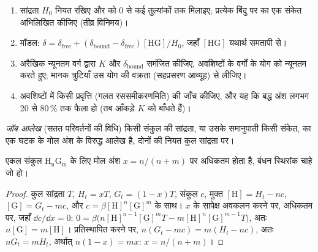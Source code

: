 \begin{method}[NMR अनुमापन से बंधन स्थिरांक]\label{met:b3:supramolecular:nmr-titration}
\begin{enumerate}
  \item {} सांद्रता $H_0$ नियत रखिए और  को 0 से कई
        तुल्यांकों तक मिलाइए; प्रत्येक बिंदु पर  का एक संकेत अभिलिखित कीजिए (तीव्र विनिमय)।
  \item मॉडल: $\delta = \delta_{\mathrm{free}} + (\delta_{\mathrm{bound}} - \delta_{\mathrm{free}})[\mathrm{HG}]/H_0$, जहाँ $[\mathrm{HG}]$ यथार्थ समतापी से।
  \item अरैखिक न्यूनतम वर्ग द्वारा $K$ और $\delta_{\mathrm{bound}}$ समंजित कीजिए, अवशिष्टों के वर्गों के योग को
        न्यूनतम करते हुए; मानक त्रुटियाँ उस योग की वक्रता
        (सहप्रसरण आव्यूह) से लीजिए।
  \item अवशिष्टों में किसी प्रवृत्ति (गलत रससमीकरणमिति) की जाँच कीजिए, और यह कि
        बद्ध अंश लगभग 20 से 80\,\% तक फैला हो (तब आँकड़े $K$ को बाँधते हैं)।
\end{enumerate}
\end{method}

\begin{definition}[जॉब आलेख]\label{def:b3:supramolecular:job}
\emph{जॉब आलेख} (सतत परिवर्तनों की विधि) किसी संकुल की सांद्रता,
या उसके समानुपाती किसी संकेत, का एक घटक के मोल अंश के विरुद्ध
आलेख है, दोनों की नियत कुल
सांद्रता पर।
\end{definition}

\begin{proposition}[जॉब आलेख का अधिकतम]\label{prop:b3:supramolecular:job}
एकल संकुल $\mathrm{H_nG_m}$ के लिए   मोल अंश
$x = n/(n + m)$ पर अधिकतम होता है, बंधन स्थिरांक चाहे जो हो।
\end{proposition}

\begin{proof}
कुल सांद्रता $T$, $H_t = xT$, $G_t = (1 - x)T$, संकुल $c$, मुक्त $[\mathrm H] = H_t - nc$,
$[\mathrm G] = G_t - mc$, और $c = \beta[\mathrm H]^n[\mathrm G]^m$ के साथ। $x$ के सापेक्ष अवकलन करने पर, अधिकतम पर, जहाँ
$\dd c/\dd x = 0$: $0 = \beta\bigl(n[\mathrm H]^{n-1}[\mathrm G]^m T - m[\mathrm H]^n[\mathrm G]^{m-1}T\bigr)$, अतः $n[\mathrm G] = m[\mathrm H]$। प्रतिस्थापित करने पर,
$n(G_t - mc) = m(H_t - nc)$, अतः $nG_t = mH_t$, अर्थात् $n(1 - x) = mx$: $x = n/(n + m)$।
\end{proof}

